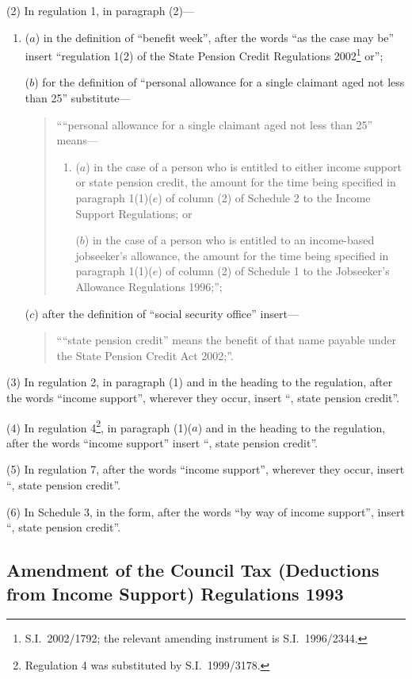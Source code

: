 \documentclass[12pt,a4paper]{article}
\begin{document}
(2) In regulation 1, in paragraph (2)—
\begin{enumerate}\item[]
($a$) in the definition of “benefit week”, after the words “as the case may be” insert “regulation 1(2) of the State Pension Credit Regulations 2002\footnote{S.I.\ 2002/1792; the relevant amending instrument is S.I.\ 1996/2344.} or”;

($b$) for the definition of “personal allowance for a single claimant aged not less than 25” substitute—
\begin{quotation}
    ““personal allowance for a single claimant aged not less than 25” means—
\begin{enumerate}\item[]
    ($a$) 
    in the case of a person who is entitled to either income support or state pension credit, the amount for the time being specified in paragraph 1(1)($e$)  of column (2) of Schedule 2 to the Income Support Regulations; or

    ($b$) 
    in the case of a person who is entitled to an income-based jobseeker’s allowance, the amount for the time being specified in paragraph 1(1)($e$)  of column (2) of Schedule 1 to the Jobseeker’s Allowance Regulations 1996;”; 
\end{enumerate}
\end{quotation}

($c$) after the definition of “social security office” insert—
\begin{quotation}
““state pension credit” means the benefit of that name payable under the State Pension Credit Act 2002;”.
\end{quotation}
\end{enumerate}

(3) In regulation 2, in paragraph (1) and in the heading to the regulation, after the words “income support”, wherever they occur, insert “, state pension credit”.

(4) In regulation 4\footnote{Regulation 4 was substituted by S.I.\ 1999/3178.}, in paragraph (1)($a$)  and in the heading to the regulation, after the words “income support” insert “, state pension credit”.

(5) In regulation 7, after the words “income support”, wherever they occur, insert “, state pension credit”.

(6) In Schedule 3, in the form, after the words “by way of income support”, insert “, state pension credit”.

\subsection[33. Amendment of the Council Tax (Deductions from Income Support) Regulations 1993]{Amendment of the Council Tax (Deductions from Income Support) Regulations 1993}
\end{document}
